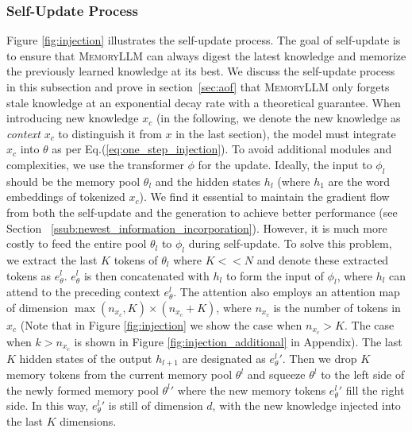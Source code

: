 \documentclass{article}
\theoremstyle{plain}
\theoremstyle{definition}
\theoremstyle{remark}
\newcommand{\ours}{\textsc{MemoryLLM}\xspace}
\begin{document}
\subsubsection{Self-Update Process}
\label{ssub:self_update_process}
Figure \ref{fig:injection} illustrates the self-update process. 
The goal of self-update is to ensure that \ours can always digest the latest knowledge and memorize the previously learned knowledge at its best. We discuss the self-update process in this subsection and prove in section~\ref{sec:aof} that \ours only forgets stale knowledge at an exponential decay rate with a theoretical guarantee.
When introducing new knowledge $x_c$ (in the following, we denote the new knowledge as \textit{context} $x_c$ to distinguish it from $x$ in the last section), the model must integrate $x_c$ into $\theta$ as per Eq.(\ref{eq:one_step_injection}). 
To avoid additional modules and complexities, we use the transformer $\phi$ for the update.
Ideally, the input to $\phi_l$ should be the memory pool $\theta_l$ and the hidden states $h_l$ (where $h_1$ are the word embeddings of tokenized $x_c$). We find it essential to maintain the gradient flow from both the self-update and the generation to achieve better performance (see Section ~\ref{ssub:newest_information_incorporation}). However, it is much more costly to feed the entire pool $\theta_l$ to $\phi_l$ during self-update. To solve this problem, 
we extract the last $K$ tokens of $\theta_l$ where $K<<N$ and denote these extracted tokens as $e_\theta^l$.
$e_\theta^l$ is then concatenated with $h_l$ to form the input of $\phi_l$, where $h_l$ can attend to the preceding context $e_\theta^l$.
The attention also employs an attention map of dimension
$\max(n_{x_c}, K) \times (n_{x_c} + K)$, where $n_{x_c}$ is the number of tokens in $x_c$ (Note that in Figure \ref{fig:injection} we show the case when $n_{x_c} > K$. The case when $k > n_{x_c}$ is shown in Figure \ref{fig:injection_additional} in Appendix). 
The last $K$ hidden states of the output $h_{l+1}$ are designated as ${e_\theta^l}'$. Then we drop $K$ memory tokens from the current memory pool $\theta^l$ and squeeze $\theta^l$ to the left side of the newly formed memory pool ${\theta^l}'$ where the new memory tokens ${e_\theta^l}'$ fill the right side.
In this way, ${e_\theta^l}'$ is still of dimension $d$, with the new knowledge injected into the last $K$ dimensions.
\end{document}
